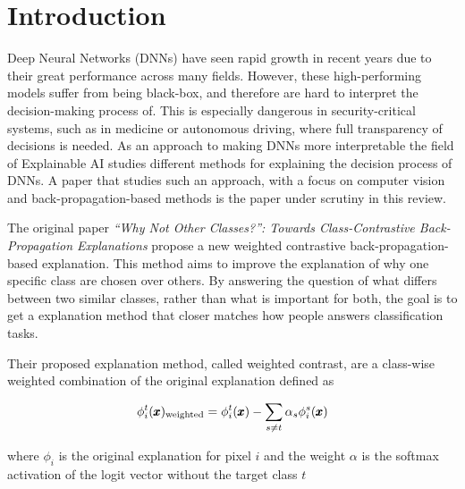 \section{Introduction}



Deep Neural Networks (DNNs) have seen rapid growth in recent years due to their great performance across many fields. However, these high-performing models suffer from being black-box, and therefore are hard to interpret the decision-making process of. This is especially dangerous in security-critical systems, such as in medicine or autonomous driving, where full transparency of decisions is needed. As an approach to making DNNs more interpretable the field of Explainable AI studies different methods for explaining the decision process of DNNs. A paper that studies such an approach, with a focus on computer vision and back-propagation-based methods is the paper under scrutiny in this review.

The original paper \textit{“Why Not Other Classes?”: Towards Class-Contrastive Back-Propagation Explanations} \citep{wang2022why} propose a new weighted contrastive back-propagation-based explanation. This method aims to improve the explanation of why one specific class are chosen over others. By answering the question of what differs between two similar classes, rather than what is important for both, the goal is to get a explanation method that closer matches how people answers classification tasks.

Their proposed explanation method, called weighted contrast, are a class-wise weighted combination of the original explanation defined as

\begin{equation}
\label{eq: weighted}
    \phi_i^t(\pmb{x})_{\textnormal{weighted}} = \phi_i^t(\pmb{x}) - \sum_{s \neq t} \alpha_s \phi_i^s(\pmb{x})
\end{equation}

where $\phi_i$ is the original explanation for pixel $i$ and the weight $\alpha$ is the softmax activation of the logit vector without the target class $t$

